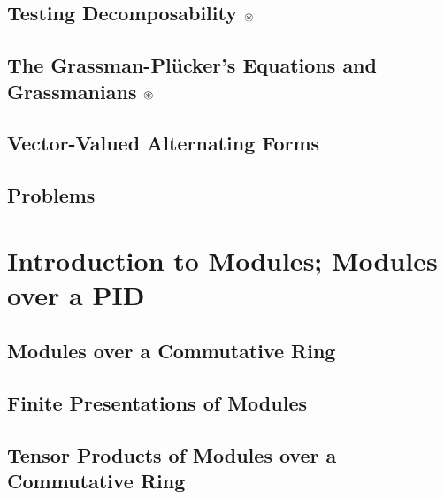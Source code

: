 \documentclass[a4paper]{article}
\begin{document}
\subsection{ Testing Decomposability $\oast$} %

\subsection{ The Grassman-Plücker's Equations and Grassmanians $\oast$} %

\subsection{ Vector-Valued Alternating Forms} %

\subsection{ Problems} %


\newpage
\section{Introduction to Modules; Modules over a PID}
\subsection{ Modules over a Commutative Ring} %

\subsection{ Finite Presentations of Modules} %

\subsection{ Tensor Products of Modules over a Commutative Ring} %
\end{document}
